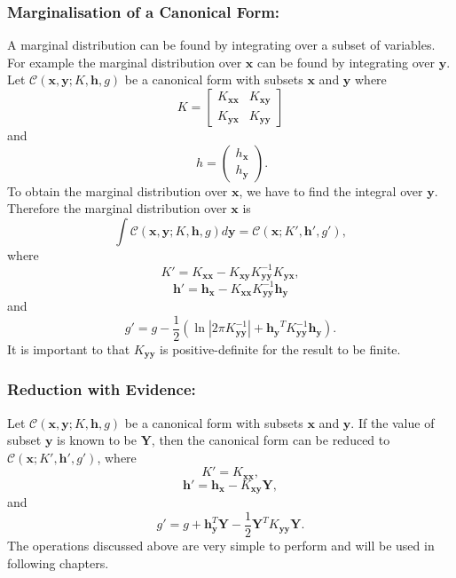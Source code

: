 \documentclass[12pt,oneside,openany,a4paper, %
afrikaans,english,
]{memoir}
\numberwithin{equation}{chapter}
\begin{document}
\subsubsection{Marginalisation of a Canonical Form:}
A marginal distribution can be found by integrating over a subset of variables. For example the marginal distribution over $\bm{x}$ can be found by integrating over $\bm{y}$. Let $\mathcal{C}(\bm{x},\bm{y};K,\bm{h},g)$ be a canonical form with subsets $\bm{x}$ and $\bm{y}$ where
\begin{equation}
K = 
\begin{bmatrix}
K_{\bm{xx}} & K_{\bm{xy}}\\
K_{\bm{yx}} & K_{\bm{yy}}
\end{bmatrix}
\end{equation}
and
\begin{equation}
\ h = 
\begin{pmatrix}
h_{\bm{x}} \\
h_{\bm{y}}
\end{pmatrix}.
\end{equation}
To obtain the marginal distribution over $\bm{x}$, we have to find the integral over $\bm{y}$. Therefore the marginal distribution over $\bm{x}$ is
\begin{equation}
\int\mathcal{C}(\bm{x},\bm{y};K,\bm{h},g)d\bm{y} = \mathcal{C}(\bm{x};K',\bm{h}',g'),
\end{equation}
 where
\begin{equation}
K' = K_{\bm{xx}} - K_{\bm{xy}}K_{\bm{yy}}^{-1}K_{\bm{yx}},
\end{equation}
\begin{equation}
\bm{h'} = \bm{h}_{\bm{x}} - K_{\bm{xx}}K_{\bm{yy}}^{-1}\bm{h}_{\bm{y}}
\end{equation}
and
\begin{equation}
g' = g - \frac{1}{2}\left(\ln|2\pi K_{\bm{yy}}^{-1}|+ \bm{h_y}^T K_{\bm{yy}}^{-1}\bm{h_y}\right).
\end{equation}
It is important to that $K_{\bm{yy}}$ is positive-definite for the result to be finite.
\subsubsection{Reduction with Evidence:}
Let $\mathcal{C}(\bm{x},\bm{y};K,\bm{h},g)$ be a canonical form with subsets $\bm{x}$ and $\bm{y}$. If the value of subset $\bm{y}$ is known to be $\bm{Y}$, then the canonical form can be reduced to $\mathcal{C}(\bm{x}; K',\bm{h}',g')$, where
\begin{equation}
K' = K_{\bm{xx}},
\end{equation}
\begin{equation}
\bm{h'} = \bm{h}_{\bm{x}} - K_{\bm{xy}}\bm{Y},
\end{equation}
and
\begin{equation}
g' = g + \bm{h}_{\bm{y}}^T\bm{Y} - \frac{1}{2}\bm{Y}^TK_{\bm{yy}}\bm{Y}.
\end{equation}
The operations discussed above are very simple to perform and will be used in following chapters.
\end{document}
